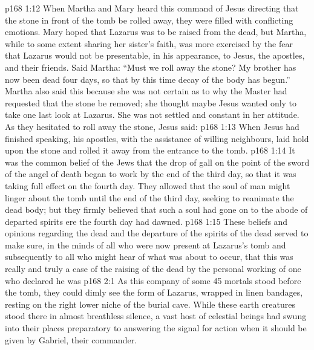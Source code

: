 \vs p168 1:12 When Martha and Mary heard this command of Jesus directing that the stone in front of the tomb be rolled away, they were filled with conflicting emotions. Mary hoped that Lazarus was to be raised from the dead, but Martha, while to some extent sharing her sister’s faith, was more exercised by the fear that Lazarus would not be presentable, in his appearance, to Jesus, the apostles, and their friends. Said Martha: “Must we roll away the stone? My brother has now been dead four days, so that by this time decay of the body has begun.” Martha also said this because she was not certain as to why the Master had requested that the stone be removed; she thought maybe Jesus wanted only to take one last look at Lazarus. She was not settled and constant in her attitude. As they hesitated to roll away the stone, Jesus said: 
\vs p168 1:13 When Jesus had finished speaking, his apostles, with the assistance of willing neighbours, laid hold upon the stone and rolled it away from the entrance to the tomb.
\vs p168 1:14 \pc It was the common belief of the Jews that the drop of gall on the point of the sword of the angel of death began to work by the end of the third day, so that it was taking full effect on the fourth day. They allowed that the soul of man might linger about the tomb until the end of the third day, seeking to reanimate the dead body; but they firmly believed that such a soul had gone on to the abode of departed spirits ere the fourth day had dawned.
\vs p168 1:15 These beliefs and opinions regarding the dead and the departure of the spirits of the dead served to make sure, in the minds of all who were now present at Lazarus’s tomb and subsequently to all who might hear of what was about to occur, that this was really and truly a case of the raising of the dead by the personal working of one who declared he was 
\vs p168 2:1 As this company of some 45 mortals stood before the tomb, they could dimly see the form of Lazarus, wrapped in linen bandages, resting on the right lower niche of the burial cave. While these earth creatures stood there in almost breathless silence, a vast host of celestial beings had swung into their places preparatory to answering the signal for action when it should be given by Gabriel, their commander.
